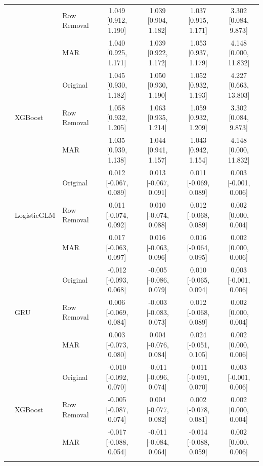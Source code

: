 \begin{longtable}{lllcccc}
 &  & Row Removal & 1.049 [0.912, 1.190] & 1.039 [0.904, 1.182] & 1.037 [0.915, 1.171] & 3.302 [0.084, 9.873] \\
 &  & MAR & 1.040 [0.925, 1.171] & 1.039 [0.922, 1.172] & 1.053 [0.937, 1.179] & 4.148 [0.000, 11.832] \\
\addlinespace
 & \multirow{3}{*}{XGBoost} & Original & 1.045 [0.930, 1.182] & 1.050 [0.930, 1.190] & 1.052 [0.932, 1.193] & 4.227 [0.663, 13.803] \\
 &  & Row Removal & 1.058 [0.932, 1.205] & 1.063 [0.935, 1.214] & 1.059 [0.932, 1.209] & 3.302 [0.084, 9.873] \\
 &  & MAR & 1.035 [0.939, 1.138] & 1.044 [0.941, 1.157] & 1.043 [0.942, 1.154] & 4.148 [0.000, 11.832] \\
\addlinespace
\multirow{9}{*}{Equal Opportunity} & \multirow{3}{*}{LogisticGLM} & Original & 0.012 [-0.067, 0.089] & 0.013 [-0.067, 0.091] & 0.011 [-0.069, 0.089] & 0.003 [-0.001, 0.006] \\
 &  & Row Removal & 0.011 [-0.074, 0.092] & 0.010 [-0.074, 0.088] & 0.012 [-0.068, 0.089] & 0.002 [0.000, 0.004] \\
 &  & MAR & 0.017 [-0.063, 0.097] & 0.016 [-0.063, 0.096] & 0.016 [-0.064, 0.095] & 0.002 [0.000, 0.006] \\
\addlinespace
 & \multirow{3}{*}{GRU} & Original & -0.012 [-0.093, 0.068] & -0.005 [-0.086, 0.079] & 0.010 [-0.065, 0.094] & 0.003 [-0.001, 0.006] \\
 &  & Row Removal & 0.006 [-0.069, 0.084] & -0.003 [-0.083, 0.073] & 0.012 [-0.068, 0.089] & 0.002 [0.000, 0.004] \\
 &  & MAR & 0.003 [-0.073, 0.080] & 0.004 [-0.076, 0.084] & 0.024 [-0.051, 0.105] & 0.002 [0.000, 0.006] \\
\addlinespace
 & \multirow{3}{*}{XGBoost} & Original & -0.010 [-0.092, 0.070] & -0.011 [-0.096, 0.074] & -0.011 [-0.091, 0.070] & 0.003 [-0.001, 0.006] \\
 &  & Row Removal & -0.005 [-0.087, 0.074] & 0.004 [-0.077, 0.082] & 0.002 [-0.078, 0.081] & 0.002 [0.000, 0.004] \\
 &  & MAR & -0.017 [-0.088, 0.054] & -0.011 [-0.084, 0.064] & -0.014 [-0.088, 0.059] & 0.002 [0.000, 0.006] \\
\addlinespace
\bottomrule
\end{longtable}